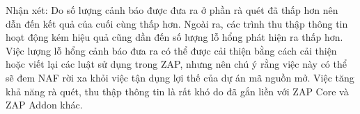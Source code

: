 \documentclass[./../main.tex]{subfiles}
\begin{document}
Nhận xét: Do số lượng cảnh báo được đưa ra ở phần rà quét đã thấp hơn nên dẫn đến kết quả của cuối cùng thấp hơn. Ngoài ra, các trình thu thập thông tin hoạt động kém hiệu quả cũng dần đến số lượng lỗ hổng phát hiện ra thấp hơn. Việc lượng lỗ hổng cảnh báo đưa ra có thể được cải thiện bằng cách cải thiện hoặc viết lại các luật sử dụng trong ZAP, nhưng nên chú ý rằng việc này có thể sẽ đem NAF rời xa khỏi việc tận dụng lợi thế của dự án mã nguồn mở. Việc tăng khả năng rà quét, thu thập thông tin là rất khó do đã gắn liền với ZAP Core và ZAP Addon khác.
\end{document}
